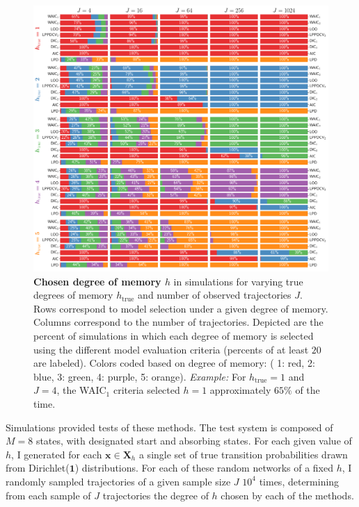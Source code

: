 \documentclass[prl,twocolumn,groupedaddress]{revtex4-1}
\newcommand{\bx}{\mathbf{x}}
\begin{document}
\begin{figure}[!ht]
\includegraphics[width=\textwidth]{fig2b}
\caption{\textbf{Chosen degree of memory $h$} in simulations for varying true degrees of memory  $h_{\textrm{true}}$ and number of observed trajectories $J$. Rows correspond to model selection under a given degree of memory. Columns correspond to the number of trajectories. Depicted are the percent of simulations in which each degree of memory is selected using the different model evaluation criteria (percents of at least $20$ are labeled). Colors coded based on degree of memory: ({\color{Set1_5_red} 1: red}, {\color{Set1_5_blue} 2: blue}, {\color{Set1_5_green}3: green}, {\color{Set1_5_purple}4: purple}, {\color{Set1_5_orange}5: orange}). \emph{Example:} For $h_{\textrm{true}}=1$ and $J=4$, the WAIC$_1$ criteria selected $h=1$ approximately $65\%$ of the time. }
\label{fig:fig2}
\end{figure}

Simulations provided tests of these methods.
The test system is composed of $M=8$ states, with designated start and absorbing states.  For each given value of $h$, I generated for each $\bx\in \mathbf{X}_h$ a single set of true transition probabilities drawn from Dirichlet($\mathbf{1}$) distributions. For each of these random networks of a fixed $h$, I randomly sampled trajectories of a given sample size $J$ $10^4$ times, determining from each sample of $J$ trajectories the degree of $h$ chosen by each of the methods.
\end{document}
